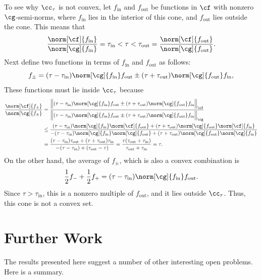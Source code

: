 \documentclass[]{elsarticle}
\theoremstyle{definition}
\theoremstyle{remark}
\begin{document}
To see why $\cc_{\tau}$ is not convex, let $f_{\text{in}}$ and $f_{\text{out}}$ be functions in $\cf$ with nonzero $\cg$-semi-norms, where $f_{\text{in}}$  lies in the interior of this cone, and $f_{\text{out}}$ lies outside the cone.  This means that 
\[
\frac{\norm[\cf]{f_{\text{in}}}} {\norm[\cg]{f_{\text{in}}}} = \tau_{\text{in}} < \tau < \tau_{\text{out}} =  \frac{\norm[\cf]{f_{\text{out}}}} {\norm[\cg]{f_{\text{out}}}}.
\]
Next define two functions in terms of $f_{\text{in}}$ and $f_{\text{out}}$ as follows:
\[
f_{\pm} = (\tau-\tau_{\text{in}}) \norm[\cg]{f_{\text{in}}} f_{\text{out}}  \pm (\tau + \tau_{\text{out}}) \norm[\cg]{f_{\text{out}}} f_{\text{in}},
\]
These functions must lie inside  $\cc_{\tau}$ because
\begin{align*}
\frac{\norm[\cf]{f_{\pm}}} {\norm[\cg]{f_{\pm}}} 
&= \frac{\Bigl \lVert (\tau-\tau_{\text{in}}) \norm[\cg]{f_{\text{in}}} f_{\text{out}}  \pm (\tau + \tau_{\text{out}}) \norm[\cg]{f_{\text{out}}} f_{\text{in}}\Bigr \rVert_{\cf}}
{\Bigl \lVert (\tau-\tau_{\text{in}}) \norm[\cg]{f_{\text{in}}} f_{\text{out}}  \pm (\tau + \tau_{\text{out}}) \norm[\cg]{f_{\text{out}}} f_{\text{in}}\Bigr \rVert_{\cg}}\\
& \le 
\frac{(\tau-\tau_{\text{in}}) \norm[\cg]{f_{\text{in}}} \norm[\cf]{f_{\text{out}}}  + (\tau + \tau_{\text{out}}) \norm[\cg]{f_{\text{out}}} \norm[\cf]{f_{\text{in}}}}
{-(\tau-\tau_{\text{in}}) \norm[\cg]{f_{\text{in}}} \norm[\cg]{f_{\text{out}}}  + (\tau + \tau_{\text{out}}) \norm[\cg]{f_{\text{out}}} \norm[\cg]{f_{\text{in}}}}\\
& =
\frac{(\tau-\tau_{\text{in}})\tau_{\text{out}}  + (\tau + \tau_{\text{out}}) \tau_{\text{in}} } {-(\tau-\tau_{\text{in}}) + (\tau_{\text{out}}-\tau)}
=
\frac{\tau (\tau_{\text{out}} +\tau_{\text{in}}) } {\tau_{\text{out}} + \tau_{\text{in}}} =  \tau.
\end{align*}
On the other hand, the average of $f_{\pm}$, which is also a convex combination is 
\[
\frac{1}{2} f_- + \frac{1}{2} f_+ = (\tau-\tau_{\text{in}}) \norm[\cg]{f_{\text{in}}} f_{\text{out}}.
\]
Since $\tau > \tau_{\text{in}}$, this is a nonzero multiple of $f_{\text{out}}$, and it lies outside $\cc_{\tau}$.  Thus, this cone is not a convex set.


\section{Further Work} \label{furthersec}

The results presented here suggest a number of other interesting open problems.  Here is a summary.
\end{document}
